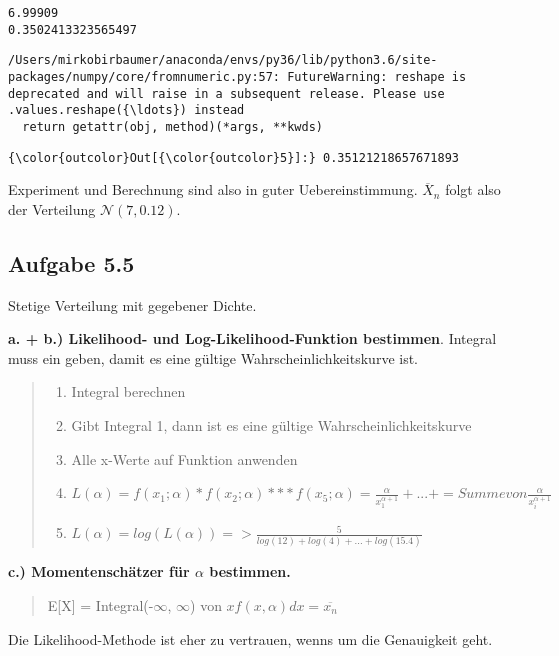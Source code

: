 \documentclass[11pt]{article}
\providecommand{\tightlist}{%
      \setlength{\itemsep}{0pt}\setlength{\parskip}{0pt}}
\begin{document}
    \begin{Verbatim}[commandchars=\\\{\}]
6.99909
0.3502413323565497

    \end{Verbatim}

    \begin{Verbatim}[commandchars=\\\{\}]
/Users/mirkobirbaumer/anaconda/envs/py36/lib/python3.6/site-packages/numpy/core/fromnumeric.py:57: FutureWarning: reshape is deprecated and will raise in a subsequent release. Please use .values.reshape({\ldots}) instead
  return getattr(obj, method)(*args, **kwds)

    \end{Verbatim}

\begin{Verbatim}[commandchars=\\\{\}]
{\color{outcolor}Out[{\color{outcolor}5}]:} 0.35121218657671893
\end{Verbatim}
            
    Experiment und Berechnung sind also in guter Uebereinstimmung.
\(\overline{X}_n\) folgt also der Verteilung \(\mathcal{N}(7,0.12)\).

    \subsection{Aufgabe 5.5}\label{aufgabe-5.5}

    Stetige Verteilung mit gegebener Dichte.

\textbf{a. + b.) Likelihood- und Log-Likelihood-Funktion bestimmen}.
Integral muss ein geben, damit es eine gültige Wahrscheinlichkeitskurve
ist.

\begin{quote}
\begin{enumerate}
\def\labelenumi{\arabic{enumi}.}
\tightlist
\item
  Integral berechnen
\item
  Gibt Integral 1, dann ist es eine gültige Wahrscheinlichkeitskurve
\item
  Alle x-Werte auf Funktion anwenden
\item
  \(L(\alpha) = f(x_1 ; \alpha) * f(x_2 ; \alpha) *** f(x_5 ; \alpha) = \frac{\alpha}{x_1^{\alpha + 1}} + ... + = Summe von \frac{\alpha}{x_i^{\alpha + 1}}\)
\item
  \(L(\alpha) = log(L(\alpha)) => \frac{5}{log(12) + log(4) + ... + log(15.4)}\)
\end{enumerate}
\end{quote}

    \textbf{c.) Momentenschätzer für \(\alpha\) bestimmen.}

\begin{quote}
E{[}X{]} = Integral(-\(\infty\), \(\infty\)) von
\(xf(x, \alpha)dx = \overline{x_n}\)
\end{quote}

Die Likelihood-Methode ist eher zu vertrauen, wenns um die Genauigkeit
geht.


    
    
    
    
\end{document}
